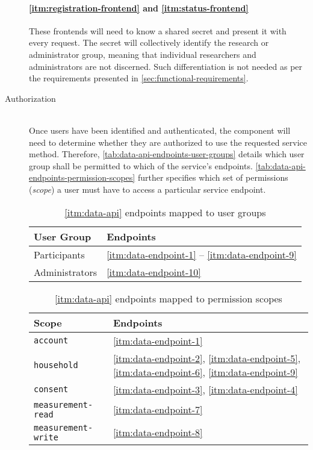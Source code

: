 \begin{description}
  \paragraph{\ref{itm:registration-frontend} and \ref{itm:status-frontend}}
  These frontends will need to know a shared secret and present it with every request. The secret will collectively identify the research or administrator group, meaning that individual researchers and administrators are not discerned. Such differentiation is not needed as per the requirements presented in \autoref{sec:functional-requirements}.

  \item[Authorization\label{itm:data-api-authorization}]
  \hfill \\
  Once users have been identified and authenticated, the component will need to determine whether they are authorized to use the requested service method. Therefore, \autoref{tab:data-api-endpoints-user-groups} details which user group shall be permitted to which of the service's endpoints. \autoref{tab:data-api-endpoints-permission-scopes} further specifies which set of permissions (\textit{scope}) a user must have to access a particular service endpoint.

\begin{table}[hbt]
	\centering
  	\begin{tabularx}{\textwidth}{|l|X|}
		\hline
		\textbf{User Group} & \textbf{Endpoints} \\
	    \hline
	    Participants & \ref{itm:data-endpoint-1} -- \ref{itm:data-endpoint-9} \\
		Administrators & \ref{itm:data-endpoint-10} \\
	    	\hline
	\end{tabularx}
  	\caption{\ref{itm:data-api} endpoints mapped to user groups}
  	\label{tab:data-api-endpoints-user-groups}
\end{table}

\FloatBarrier

\begin{table}[hbt]
	\centering
  	\begin{tabularx}{\textwidth}{|l|X|}
		\hline
		\textbf{Scope} & \textbf{Endpoints} \\
	    \hline
	    \texttt{account} & \ref{itm:data-endpoint-1} \\
		\texttt{household} & \ref{itm:data-endpoint-2}, \ref{itm:data-endpoint-5}, \ref{itm:data-endpoint-6}, \ref{itm:data-endpoint-9} \\
		\texttt{consent} & \ref{itm:data-endpoint-3}, \ref{itm:data-endpoint-4} \\
		\texttt{measurement-read} & \ref{itm:data-endpoint-7} \\
		\texttt{measurement-write} & \ref{itm:data-endpoint-8} \\
	    	\hline
	\end{tabularx}
  	\caption{\ref{itm:data-api} endpoints mapped to permission scopes}
  	\label{tab:data-api-endpoints-permission-scopes}
\end{table}


\end{description}
